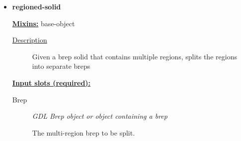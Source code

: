 \documentclass [11pt]{book}
\begin{document}
\begin{itemize}







\item {}
\label{prim:regioned-solid}
\textbf{regioned-solid}


\textbf{
\underline{Mixins:}} base-object





\begin{description}

\item [
\underline{Description}]


Given a brep solid that contains multiple regions, splits the regions into separate breps



\end{description}








\textbf{
\underline{Input slots (required):}}

\begin{description}

\item [Brep]
\emph{GDL Brep object or object containing a brep}

 The multi-region brep to be split.




\end{description}







\end{itemize}
\end{document}
